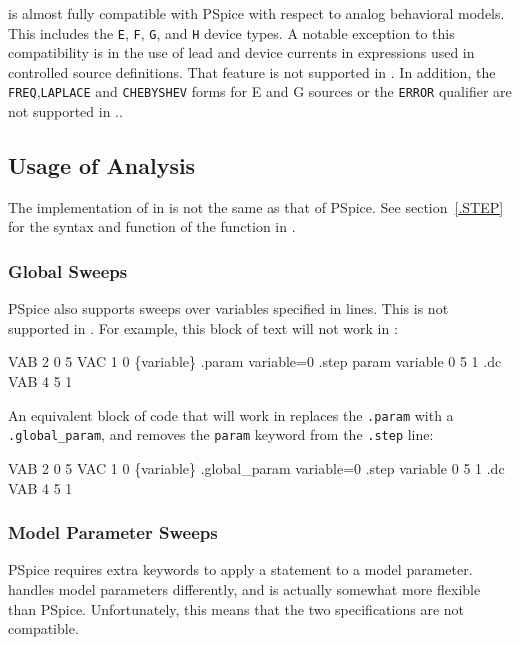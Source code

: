 \Xyce{} is almost fully compatible with PSpice with respect to analog
behavioral models.  This includes the
\texttt{E},
\texttt{F},
\texttt{G}, and
\texttt{H} 
device types.  A notable exception to this compatibility is in the use of lead and device
currents in expressions used in controlled source definitions.  That feature is not 
supported in \Xyce{}.  In addition, the \texttt{FREQ},\texttt{LAPLACE} and 
\texttt{CHEBYSHEV} forms for E and G sources or the \texttt{ERROR} qualifier are 
not supported in \Xyce{}..
  
\subsection{Usage of  Analysis}

The implementation of  in \Xyce{} is not the
same as that of PSpice.  See section~\ref{.STEP} for the syntax and
function of the  function in \Xyce{}.

\subsubsection{Global  Sweeps}

PSpice also supports sweeps over variables specified in  lines.
This is not supported in \Xyce{}.  For example, this block of text will not
work in \Xyce{}:
\begin{vquote}
VAB 2 0 5
VAC 1 0 \{variable\}
.param variable=0
.step param variable 0 5 1
.dc VAB 4 5 1
\end{vquote}
An equivalent block of code that will work in \Xyce{} replaces the
\texttt{.param} with a \texttt{.global\_param}, and removes the
\texttt{param} keyword from the \texttt{.step} line:
\begin{vquote}
VAB 2 0 5
VAC 1 0 \{variable\}
.global\_param variable=0
.step variable 0 5 1
.dc VAB 4 5 1
\end{vquote}

\subsubsection{Model Parameter Sweeps}

PSpice requires extra keywords to apply a  statement to a
model parameter.  \Xyce{} handles model parameters differently, and is
actually somewhat more flexible than PSpice.  Unfortunately, this means
that the two specifications are not compatible.

